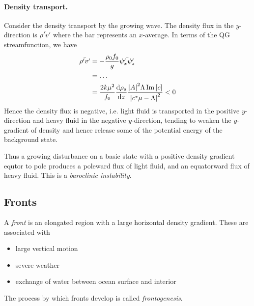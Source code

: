 \documentclass{jknotes}
\begin{document}
\paragraph{Density transport.}
Consider the density transport by the growing wave. The density flux in the
$y$-direction is $\bar{\rho' v'}$ where the bar represents an $x$-average. In
terms of the QG streamfunction, we have
\begin{align}
	\bar{\rho' v'} &= - \frac{\rho_0 f_0}{g}\bar{\psi'_x \psi'_z}\\
	&= \dots\\
	&= \frac{2k\mu^2}{f_0} \frac{\diffd \rho_s}{\diffd z} \frac{\abs{A}^2
\Lambda \Im\left[c\right]}{\abs{c^*\mu -\Lambda}^2} < 0
\end{align}
Hence the density flux is negative, i.e. light fluid is transported in the
positive $y$-direction and heavy fluid in the negative $y$-direction, tending
to weaken the $y$-gradient of density and hence release some of the potential
energy of the background state.

Thus a growing disturbance on a basic state with a positive density gradient
equtor to pole produces a poleward flux of light fluid, and an equatorward
flux of heavy fluid. This is a \emph{baroclinic instability}. 

\subsection{Fronts}
A \emph{front} is an elongated region with a large horizontal density
gradient. These are associated with
\begin{itemize}
	\item large vertical motion
	\item severe weather
	\item exchange of water between ocean surface and interior
\end{itemize}

The process by which fronts develop is called \emph{frontogenesis}.
\end{document}
